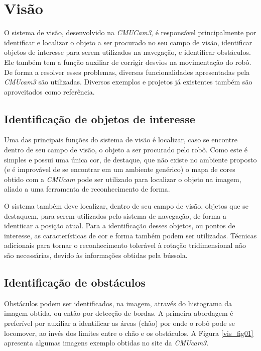 \chapter{Visão}

O sistema de visão, desenvolvido na \textit{CMUCam3}, é responsável principalmente por identificar e localizar o objeto a ser procurado no seu campo de visão, identificar objetos de interesse para serem utilizados na navegação, e identificar obstáculos. Ele também tem a função auxiliar de corrigir desvios na movimentação do robô. De forma a resolver esses problemas, diversas funcionalidades apresentadas pela \textit{CMUcam3} são utilizadas. Diversos exemplos e projetos já existentes também são aproveitados como referência.

\section{Identificação de objetos de interesse}

Uma das principais funções do sistema de visão é localizar, caso se encontre dentro de seu campo de visão, o objeto a ser procurado pelo robô. Como este é simples e possui uma única cor, de destaque, que não existe no ambiente proposto (e é improvável de se encontrar em um ambiente genérico) o mapa de cores obtido com a \textit{CMUcam} pode ser utilizado para localizar o objeto na imagem, aliado a uma ferramenta de reconhecimento de forma.

O sistema também deve localizar, dentro de seu campo de visão, objetos que se destaquem, para serem utilizados pelo sistema de navegação, de forma a identiicar a posição atual. Para a identificação desses objetos, ou pontos de interesse, as características de cor e forma também podem ser utilizadas. Técnicas adicionais para tornar o reconhecimento tolerável à rotação tridimensional não são necessárias, devido às informações obtidas pela bússola.

\section{Identificação de obstáculos}

Obstáculos podem ser identificados, na imagem, através do histograma da imagem obtida, ou então por detecção de bordas. A primeira abordagem é preferível por auxiliar a identificar as áreas (chão) por onde o robô pode se locomover, ao invés dos limites entre o chão e os obstáculos. A Figura \ref{vis_fig01} apresenta algumas imagens exemplo obtidas no site da \textit{CMUcam3}.

